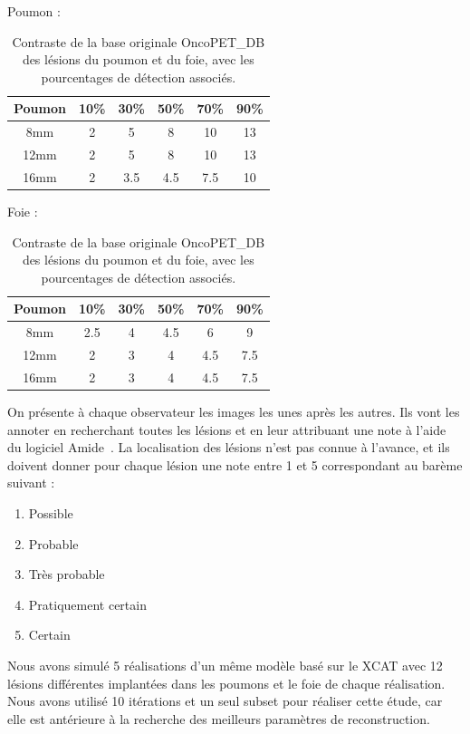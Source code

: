 \begin{table}
\centering
Poumon :\\
\begin{tabular}{|c||c|c|c|c|c|}
 \hline
Poumon	& 10\% & 30\% & 50\% & 70\% & 90\% \\
\hline
8mm	& 2    &  5   &  8   & 10   & 13   \\
\hline
12mm    & 2    &  5   &  8   & 10   & 13   \\
\hline
16mm    & 2    &  3.5 &  4.5 & 7.5  & 10   \\
\hline
\end{tabular}

\vspace{0.5cm}

Foie :\\
\begin{tabular}{|c||c|c|c|c|c|}
 \hline
Poumon	& 10\% & 30\% & 50\% & 70\% & 90\% \\
\hline
8mm	& 2.5    &  4   &  4.5   & 6   & 9   \\
\hline
12mm    & 2    &  3   &  4   & 4.5   & 7.5   \\
\hline
16mm    & 2    &  3   &  4   & 4.5   & 7.5   \\
\hline
\end{tabular}
\caption[Contraste de la base originale OncoPET\_DB des lésions du poumon et du foie pour létude de détectabilité]{Contraste de la base originale OncoPET\_DB des lésions du poumon et du foie, avec les pourcentages de détection associés.}
\label{fig:contrtasteFoiePoumonOrig}
\end{table}


On présente à chaque observateur les images les unes après les autres. Ils vont les annoter en recherchant toutes les lésions et en leur attribuant une note à l'aide du logiciel Amide~\cite{loening2003amide}. La localisation des lésions n'est pas connue à l'avance, et ils doivent donner pour chaque lésion une note entre 1 et 5 correspondant au barème suivant :

\begin{enumerate}
\item Possible
\item Probable
\item Très probable
\item Pratiquement  certain
\item Certain
\end{enumerate}

Nous avons simulé 5 réalisations d'un même modèle basé sur le XCAT avec 12 lésions différentes implantées dans les poumons et le foie de chaque réalisation. Nous avons utilisé 10 itérations et un seul subset pour réaliser cette étude, car elle est antérieure à la recherche des meilleurs paramètres de reconstruction.

